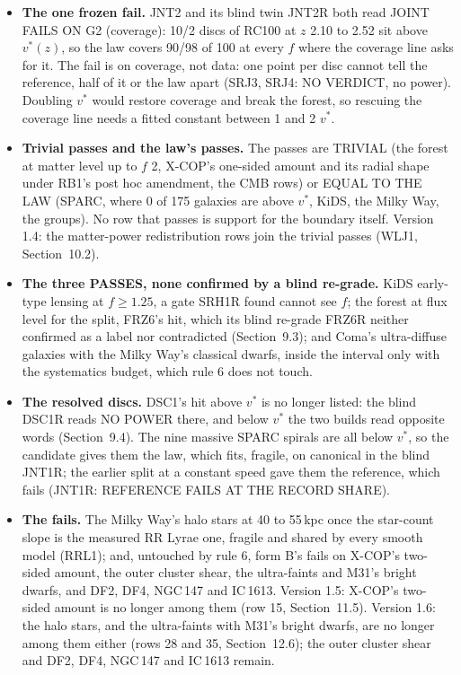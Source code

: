 \documentclass[10pt]{article}
\begin{document}
\begin{itemize}
\item \textbf{The one frozen fail.} JNT2 and its blind twin JNT2R both read JOINT FAILS ON G2 (coverage): 10/2 discs of RC100 at $z$ 2.10 to 2.52 sit above $v^*(z)$, so the law covers 90/98 of 100 at every $f$ where the coverage line asks for it. The fail is on coverage, not data: one point per disc cannot tell the reference, half of it or the law apart (SRJ3, SRJ4: NO VERDICT, no power). Doubling $v^*$ would restore coverage and break the forest, so rescuing the coverage line needs a fitted constant between 1 and 2 $v^*$.
\item \textbf{Trivial passes and the law's passes.} The passes are TRIVIAL (the forest at matter level up to $f$ 2, X-COP's one-sided amount and its radial shape under RB1's post hoc amendment, the CMB rows) or EQUAL TO THE LAW (SPARC, where 0 of 175 galaxies are above $v^*$, KiDS, the Milky Way, the groups). No row that passes is support for the boundary itself. Version 1.4: the matter-power redistribution rows join the trivial passes (WLJ1, Section~10.2).
\item \textbf{The three PASSES, none confirmed by a blind re-grade.} KiDS early-type lensing at $f\ge1.25$, a gate SRH1R found cannot see $f$; the forest at flux level for the split, FRZ6's hit, which its blind re-grade FRZ6R neither confirmed as a label nor contradicted (Section~9.3); and Coma's ultra-diffuse galaxies with the Milky Way's classical dwarfs, inside the interval only with the systematics budget, which rule 6 does not touch.
\item \textbf{The resolved discs.} DSC1's hit above $v^*$ is no longer listed: the blind DSC1R reads NO POWER there, and below $v^*$ the two builds read opposite words (Section~9.4). The nine massive SPARC spirals are all below $v^*$, so the candidate gives them the law, which fits, fragile, on canonical in the blind JNT1R; the earlier split at a constant speed gave them the reference, which fails (JNT1R: REFERENCE FAILS AT THE RECORD SHARE).
\item \textbf{The fails.} The Milky Way's halo stars at 40 to 55\,kpc once the star-count slope is the measured RR Lyrae one, fragile and shared by every smooth model (RRL1); and, untouched by rule 6, form B's fails on X-COP's two-sided amount, the outer cluster shear, the ultra-faints and M31's bright dwarfs, and DF2, DF4, NGC\,147 and IC\,1613. Version 1.5: X-COP's two-sided amount is no longer among them (row 15, Section~11.5). Version 1.6: the halo stars, and the ultra-faints with M31's bright dwarfs, are no longer among them either (rows 28 and 35, Section~12.6); the outer cluster shear and DF2, DF4, NGC\,147 and IC\,1613 remain.
\end{itemize}
\end{document}
